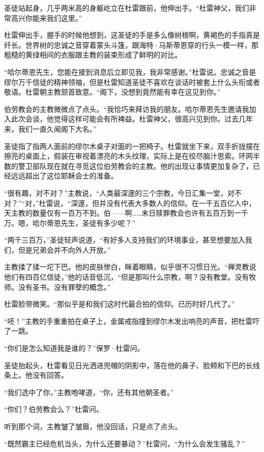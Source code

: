 \documentclass[AutoFakeBold=true]{book}
\begin{document}
圣徒站起身，几乎两米高的身躯屹立在杜雷跟前，他伸出手。``杜雷神父，我们非常高兴你能来我们这里。''

杜雷伸出手，握手的时候他想到，这圣徒的手是多么像树根啊，黄褐色的手指真是纤长。世界树的忠诚之音穿着蒙头斗篷，跟海特·马斯蒂恩穿的行头一模一样，那粗糙的黄绿相间的衣服跟主教的装束形成了鲜明的对比。

``哈尔蒂恩先生，您能在接到消息后立即见我，我非常感谢。''杜雷说。忠诚之音是缪尔万千信徒的精神领袖，但是杜雷知道圣徒不喜欢在谈话时被套上什么头衔或者敬语。杜雷朝主教颔首致意。``阁下，没想到竟然能有幸在这见到你。''

伯劳教会的主教微微点了点头。``我恰巧来拜访我的朋友。哈尔蒂恩先生邀请我加入此次会谈，他觉得这样可能会有所裨益。杜雷神父，很高兴见到你。过去几年来，我们一直久闻阁下大名。''

圣徒指了指两人面前的缪尔木桌子对面的一把椅子。杜雷就坐下来，双手折拢摆在擦亮的桌面上，假装在审视着漂亮的木头纹理，实际上是在绞尽脑汁思索。环网半数的警卫部队现在就在寻觅这位伯劳教会的主教。他的出现让事情更加复杂了，已经远远超出了这位耶稣会士的准备。

``很有趣，对不对？''主教说，``人类最深邃的三个宗教，今日汇集一堂，对不对？''``对，''杜雷说，``深邃，但并没有代表大多数人的信仰。在一千五百亿人中，天主教的数量仅有一百万不到。伯——啊……末日赎罪教会也许有五百万到一千万。嗯，哈尔蒂恩先生，圣徒有多少呢？''

``两千三百万，''圣徒轻声说道，``有好多人支持我们的环境事业，甚至想要加入我们，但是兄弟会并不向外人开放。''

主教揉了揉一坨下巴。他的皮肤惨白，眯着眼睛，似乎很不习惯日光。``禅灵教说他们有四百亿信徒，''他的话音低沉，``但是那叫什么宗教，啊？没有教堂。没有牧师。没有圣书。没有罪孽的概念。''

杜雷脸带微笑。``那似乎是和我们这时代最合拍的信仰。已历时好几代了。''

``呸！''主教的手重重拍在桌子上，金属戒指撞到缪尔木发出响亮的声音，把杜雷吓了一跳。

``你们是怎么知道我是谁的？''保罗·杜雷问。

圣徒抬起头，杜雷看见日光洒进兜帽的阴影中，落在他的鼻子、脸颊和下巴的长线条上。他没有回答。

``我们选中了你，''主教咆哮道，``你，还有其他朝圣者。''

``你们？伯劳教会么？''杜雷问。

听到那个词，主教皱了皱眉，他没回话，只是点了点头。

``既然霸主已经危机当头，为什么还要暴动？''杜雷问，``为什么会发生骚乱？''
\end{document}
